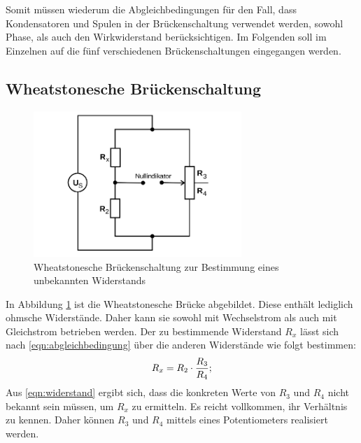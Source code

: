 Somit müssen wiederum die Abgleichbedingungen für den Fall, dass Kondensatoren und Spulen in der Brückenschaltung verwendet werden, sowohl Phase, als auch den Wirkwiderstand berücksichtigen.
Im Folgenden soll im Einzelnen auf die fünf verschiedenen Brückenschaltungen eingegangen werden.

\subsection{Wheatstonesche Brückenschaltung}
\begin{figure}
  \centering
  \includegraphics[width=0.7\textwidth]{Bilder/Wheatstone_bruecke.png}
  \caption{Wheatstonesche Brückenschaltung zur Bestimmung eines unbekannten Widerstands \cite{Anleitung}}
  \label{fig:wheatstonebrücke}
\end{figure}

In Abbildung \ref{fig:wheatstonebrücke} ist die Wheatstonesche Brücke abgebildet. Diese enthält lediglich ohmsche Widerstände. Daher kann sie sowohl mit Wechselstrom als auch mit Gleichstrom betrieben werden.
Der zu bestimmende Widerstand $R_x$ lässt sich nach \eqref{eqn:abgleichbedingung} über die anderen Widerstände wie folgt bestimmen:
\begin{equation}
  \centering
  R_x=R_2 \cdot \frac{R_3}{R_4};
\label{eqn:widerstand}
\end{equation}
Aus \eqref{eqn:widerstand} ergibt sich, dass die konkreten Werte von $R_3$ und $R_4$ nicht bekannt sein müssen, um $R_x$ zu ermitteln. Es reicht vollkommen, ihr Verhältnis zu kennen.
Daher können $R_3$ und $R_4$ mittels eines Potentiometers realisiert werden.

